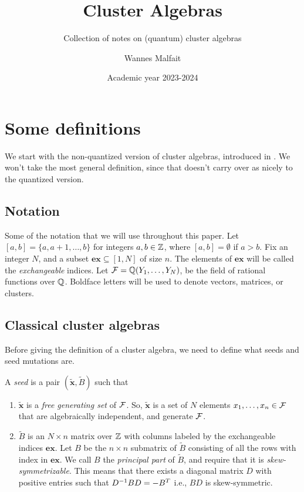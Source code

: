 \documentclass{article}
\title{Cluster Algebras}
\subtitle{Collection of notes on (quantum) cluster algebras}
\author{Wannes Malfait}
\date{Academic year 2023-2024}
\newcommand{\ex}{\mathbf{ex}}
\begin{document}
\maketitle
\newpage
\tableofcontents
\newpage

\section{Some definitions}

We start with the non-quantized version of cluster algebras, introduced in
\cite{FominZelivinsky2002CAF}. We won't take the most general definition, since that
doesn't carry over as nicely to the quantized version.

\subsection{Notation}

Some of the notation that we will use throughout this paper. Let $[a,b] = \{a, a+1,
	\dots, b\}$ for integers $a,b \in \mathbb{Z}$, where $[a,b] = \emptyset$ if $a > b$. Fix an
integer $N$, and a subset $\ex \subseteq [1, N]$ of size $n$. The elements of $\ex$
will be called the \emph{exchangeable} indices. Let $\mathcal{F} = \mathbb{Q}(Y_1, \dots, Y_N)$, be
the field of rational functions over $\mathbb{Q}$. Boldface letters will be used to denote
vectors, matrices, or clusters.

\subsection{Classical cluster algebras}

Before giving the definition of a cluster algebra, we need to define what seeds and
seed mutations are.
\begin{definition}
	A \emph{seed} is a pair $(\tilde{\mathbf{x}}, \tilde{B})$ such that
	\begin{enumerate}
		\item $\tilde{\mathbf{x}}$ is a \emph{free generating set} of $\mathcal{F}$.
		      So, $\tilde{\mathbf{x}}$ is a set of $N$ elements $x_1, \dots, x_n \in \mathcal{F}$ that are algebraically independent, and generate $\mathcal{F}$.
		\item $\tilde{B}$ is an $N \times n$ matrix over $\mathbb{Z}$ with columns labeled by the exchangeable
		      indices $\ex$. Let $B$ be the $n \times n$ submatrix
		      of $\tilde{B}$ consisting of all the rows with index in $\ex$.
		      We call $B$ the \emph{principal part} of $\tilde{B}$, and require that it is \emph{skew-symmetrizable}.
		      This means that there exists a diagonal matrix $D$ with positive entries
		      such that $D^{-1} B D = - B^T$ i.e., $BD$ is skew-symmetric.
	\end{enumerate}
\end{definition}
\end{document}
